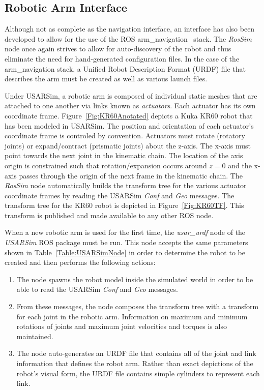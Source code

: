 \subsection*{Robotic Arm Interface}
Although not as complete as the navigation interface, an interface has also been developed to allow for the use of the ROS arm\_navigation~\cite{RosArmNavWeb} stack. The {\it RosSim} node once again strives to allow for auto-discovery of the robot and thus eliminate the need for hand-generated configuration files. In the case of the arm\_navigation stack, a Unified Robot Description Format (URDF) file that describes the arm must be created as well as various launch files. 

Under USARSim, a robotic arm is composed of individual static meshes that are attached to one another via  links known as {\it actuators}. Each actuator has its own coordinate frame. Figure~\ref{Fig:KR60Anotated} depicts a Kuka KR60 robot that has been modeled in USARSim. The position and orientation of each actuator's coordinate frame is controled by convention. Actuators must rotate (rotatory joints) or expand/contract (prismatic joints) about the z-axis. The x-axis must point towards the next joint in the kinematic chain. The location of the axis origin is constrained such that rotation/expansion occurs around $z=0$ and the x-axis passes through the origin of the next frame in the kinematic chain. The {\it RosSim} node automatically builds the transform tree for the various actuator coordinate frames by reading the USARSim {\it Conf} and {\it Geo} messages. The transform tree for the KR60 robot is depicted in Figure~\ref{Fig:KR60TF}. This transform is published and made available to any other ROS node.

When a new robotic arm is used for the first time, the {\it usar\_urdf} node of the {\it USARSim} ROS package must be run. This node accepts the same parameters shown in Table~\ref{Table:USARSimNode} in order to determine the robot to be created and then performs the following actions:
\begin{enumerate}
\item The node spawns the robot model inside the simulated world in order to be able to read the USARSim  {\it Conf} and {\it Geo} messages.
\item From these messages, the node composes the transform tree with a transform for each joint in the robotic arm. Information on maximum and minimum rotations of joints and maximum joint velocities and torques is also maintained.
\item The node auto-generates an URDF file that contains all of the joint and link information that defines the robot arm. Rather than exact depictions of the robot's visual form, the URDF file contains simple cylinders to represent each link.
\end{enumerate}

